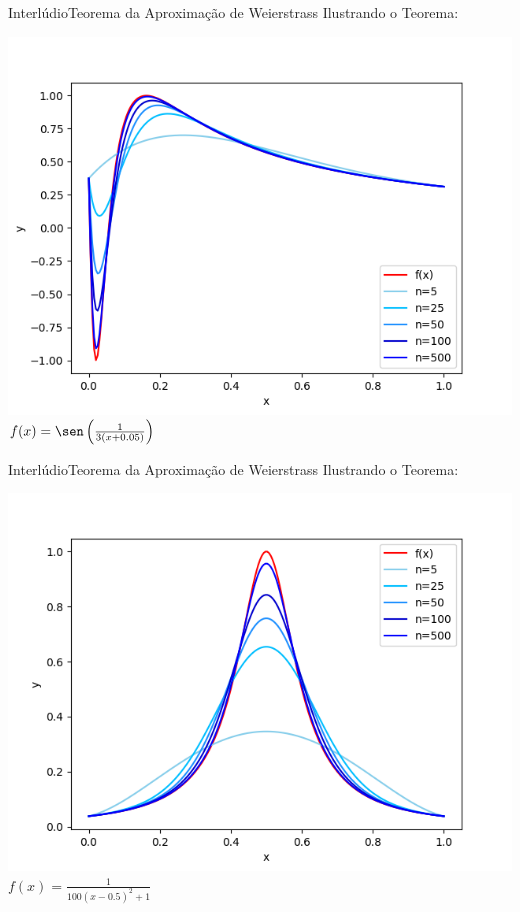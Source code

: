 \documentclass[13pt]{beamer}
\begin{document}
\begin{frame}{Interlúdio}{Teorema da Aproximação de Weierstrass}
    \vspace{3pt}
    Ilustrando o Teorema:
    \begin{center}
        \includegraphics[width=.75\textwidth]{../figuras/weierstrass_seno.png}
        \( f ( x ) = \sen \left( \frac{ 1 }{ 3 ( x + 0.05 ) } \right) \)
    \end{center}
\end{frame}

\begin{frame}{Interlúdio}{Teorema da Aproximação de Weierstrass}
    \vspace{3pt}
    Ilustrando o Teorema:
    \begin{center}
        \includegraphics[width=.75\textwidth]{../figuras/weierstrass_cauchy.png}
        \( f ( x ) = \frac{ 1 }{ 100 ( x - 0.5 )^2 + 1 } \)
    \end{center}
\end{frame}
\end{document}
